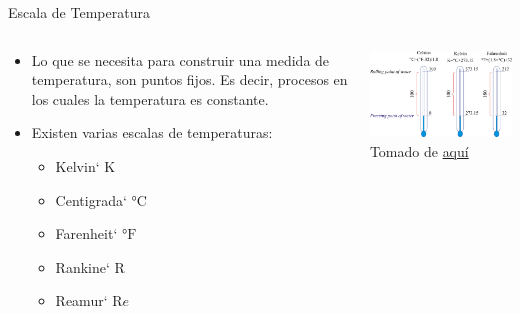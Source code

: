 \documentclass[aspectratio=169]{beamer}
\begin{document}
\begin{frame}{Escala de Temperatura}
    \begin{columns}[c, onlytextwidth]
        \begin{column}{0.50\textwidth}
            \begin{itemize}
                \item Lo que se necesita para construir una medida de temperatura, son puntos fijos. Es decir, procesos en los cuales la temperatura es constante.
                \item Existen varias escalas de temperaturas:
                \begin{itemize}
                    \item Kelvin` $\si{\kelvin}$
                    \item Centigrada` $\si{\celsius}$
                    \item Farenheit` $\si{\degree}\mathrm{F}$
                    \item Rankine` $\mathrm{R}$
                    \item Reamur` $\mathrm{R}e$
                \end{itemize}
            \end{itemize}
        \end{column}
        \begin{column}{0.5\textwidth}
            \includegraphics[width=7cm]{fig/temperature_scales.png}
            \newline
            \tiny{Tomado de \href{https://glossary.periodni.com/dictionary.php?en=logaritamska+skala}{aquí}}
        \end{column}
    \end{columns}
\end{frame}
\end{document}
